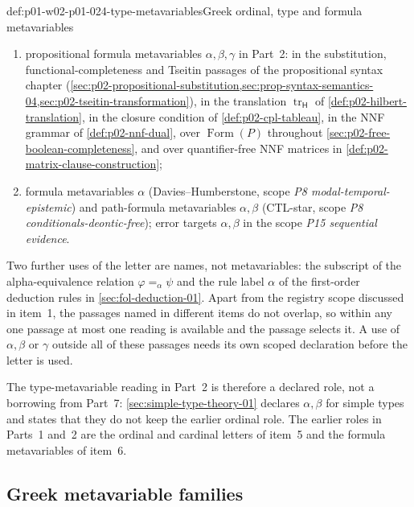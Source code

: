 \begin{hbconvention}{def:p01-w02-p01-024-type-metavariables}{Greek ordinal, type and formula metavariables}
\begin{enumerate}
  (\(\alpha<\kappa\)) of \cref{sec:fol-cardinality-normalforms-02};
\item propositional formula metavariables \(\alpha,\beta,\gamma\) in
  Part~2: in the substitution, functional-completeness and Tseitin
  passages of the propositional syntax chapter
  (\cref{sec:p02-propositional-substitution,sec:prop-syntax-semantics-04,sec:p02-tseitin-transformation}),
  in the translation \(\operatorname{tr}_{\mathsf H}\) of
  \cref{def:p02-hilbert-translation}, in the closure condition of
  \cref{def:p02-cpl-tableau}, in the NNF grammar of
  \cref{def:p02-nnf-dual}, over \(\operatorname{Form}(P)\) throughout
  \cref{sec:p02-free-boolean-completeness}, and over quantifier-free NNF
  matrices in \cref{def:p02-matrix-clause-construction};
\item formula metavariables \(\alpha\) (Davies--Humberstone, scope
  \emph{P8 modal-temporal-epistemic}) and path-formula metavariables
  \(\alpha,\beta\) (CTL-star, scope \emph{P8 conditionals-deontic-free});
  error targets \(\alpha,\beta\) in the scope \emph{P15 sequential
  evidence}.
\end{enumerate}
Two further uses of the letter are names, not metavariables: the
subscript of the alpha-equivalence relation \(\varphi=_{\alpha}\psi\) and
the rule label \(\alpha\) of the first-order deduction rules in
\cref{sec:fol-deduction-01}.  Apart from the registry scope discussed in
item~1, the passages named in different items do not overlap, so within any
one passage at most one reading is available and the passage selects it.  A
use of \(\alpha,\beta\) or \(\gamma\) outside all of these passages needs
its own scoped declaration before the letter is used.
\end{hbconvention}

The type-metavariable reading in Part~2 is therefore a declared role, not a
borrowing from Part~7: \cref{sec:simple-type-theory-01} declares
\(\alpha,\beta\) for simple types and states that they do not keep the
earlier ordinal role.  The earlier roles in Parts~1 and~2 are the ordinal
and cardinal letters of item~5 and the formula metavariables of item~6.

\subsection{Greek metavariable families}
\label{sec:p01-w02-p01-024-greek}

